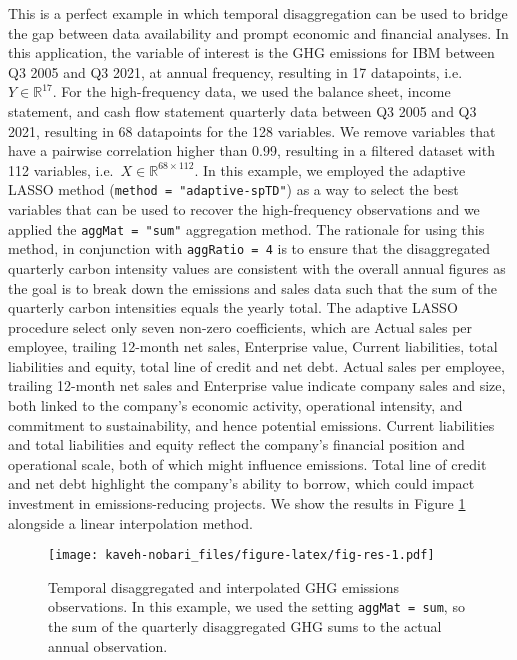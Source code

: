 This is a perfect example in which temporal disaggregation can be used to bridge the gap between data availability and prompt economic and financial analyses. In this application, the variable of interest is the GHG emissions for IBM between Q3 2005 and Q3 2021, at annual frequency, resulting in 17 datapoints, i.e.~\(Y\in \mathbb{R}^{17}\). For the high-frequency data, we used the balance sheet, income statement, and cash flow statement quarterly data between Q3 2005 and Q3 2021, resulting in 68 datapoints for the 128 variables. We remove variables that have a pairwise correlation higher than 0.99, resulting in a filtered dataset with 112 variables, i.e.~\(X \in \mathbb{R}^{68\times 112}\). In this example, we employed the adaptive LASSO method (\texttt{method\ =\ "adaptive-spTD"}) as a way to select the best variables that can be used to recover the high-frequency observations and we applied the \texttt{aggMat\ =\ "sum"} aggregation method. The rationale for using this method, in conjunction with \texttt{aggRatio\ =\ 4} is to ensure that the disaggregated quarterly carbon intensity values are consistent with the overall annual figures as the goal is to break down the emissions and sales data such that the sum of the quarterly carbon intensities equals the yearly total. The adaptive LASSO procedure select only seven non-zero coefficients, which are Actual sales per employee, trailing 12-month net sales, Enterprise value, Current liabilities, total liabilities and equity, total line of credit and net debt. Actual sales per employee, trailing 12-month net sales and Enterprise value indicate company sales and size, both linked to the company's economic activity, operational intensity, and commitment to sustainability, and hence potential emissions. Current liabilities and total liabilities and equity reflect the company's financial position and operational scale, both of which might influence emissions. Total line of credit and net debt highlight the company's ability to borrow, which could impact investment in emissions-reducing projects. We show the results in Figure \ref{fig:fig-res} alongside a linear interpolation method.

\begin{figure}
\centering
\texttt{[image: kaveh-nobari\_files/figure-latex/fig-res-1.pdf]}
\caption{\label{fig:fig-res}Temporal disaggregated and interpolated GHG emissions observations. In this example, we used the setting \texttt{aggMat\ =\ sum}, so the sum of the quarterly disaggregated GHG sums to the actual annual observation.}
\end{figure}

